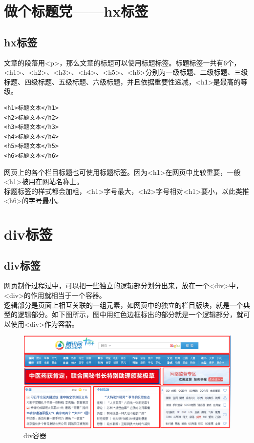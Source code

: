 \newpage

\section{做个标题党——hx标签}

\subsection{hx标签}

文章的段落用<p>，那么文章的标题可以使用标题标签。标题标签一共有6个，<h1>、<h2>、<h3>、<h4>、<h5>、<h6>分别为一级标题、二级标题、三级标题、四级标题、五级标题、六级标题，并且依据重要性递减，<h1>是最高的等级。\\

\begin{lstlisting}[style=htmlcssjs]
<h1>标题文本</h1>
<h2>标题文本</h2>
<h3>标题文本</h3>
<h4>标题文本</h4>
<h5>标题文本</h5>
<h6>标题文本</h6>
\end{lstlisting}

网页上的各个栏目标题也可使用标题标签。因为<h1>在网页中比较重要，一般<h1>被用在网站名称上。\\

标题标签的样式都会加粗，<h1>字号最大，<h2>字号相对<h1>要小，以此类推<h6>的字号最小。

\newpage

\section{div标签}

\subsection{div标签}

网页制作过程过中，可以把一些独立的逻辑部分划分出来，放在一个<div>中，<div>的作用就相当于一个容器。\\

逻辑部分是页面上相互关联的一组元素，如网页中的独立的栏目版块，就是一个典型的逻辑部分。如下图所示，图中用红色边框标出的部分就是一个逻辑部分，就可以使用<div>作为容器。

\begin{figure}[H]
	\centering
	\includegraphics[scale=0.5]{img/C2/2-3/1.png}
	\caption{div容器}
\end{figure}

